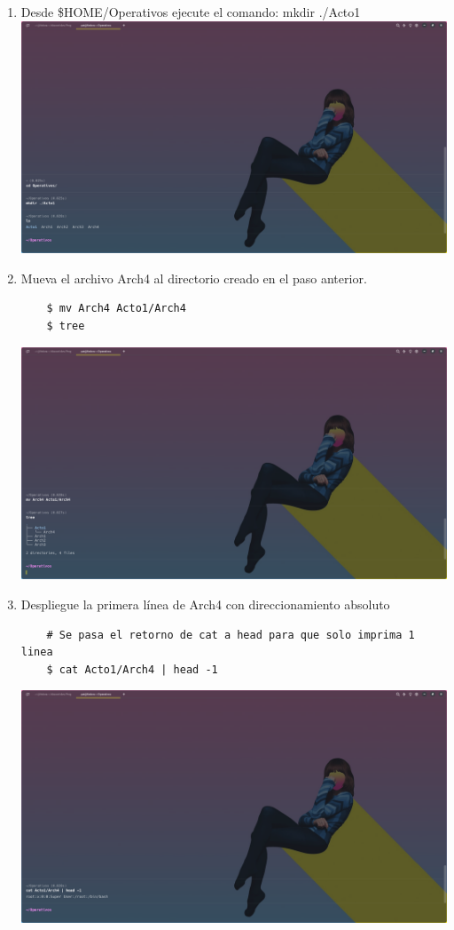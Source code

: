 \documentclass{article}
\begin{document}
\begin{enumerate}
    \item Desde \$HOME/Operativos ejecute el comando: mkdir ./Acto1
    \\
    \includegraphics[scale=0.25,trim={0 0 20cm 25cm},clip]{LinuxCapturas/newdir.png} 

    \item Mueva el archivo Arch4 al directorio creado en el paso anterior.
    \begin{verbatim}
    $ mv Arch4 Acto1/Arch4
    $ tree
    \end{verbatim}
    \includegraphics[scale=0.25,trim={0 0 20cm 25cm},clip]{LinuxCapturas/move.png}  

    \item Despliegue la primera línea de Arch4 con direccionamiento absoluto
    \begin{verbatim}
    # Se pasa el retorno de cat a head para que solo imprima 1 linea
    $ cat Acto1/Arch4 | head -1
    \end{verbatim}
    \includegraphics[scale=0.25,trim={0 0 20cm 25cm},clip]{LinuxCapturas/catline.png}


\end{enumerate}
\end{document}
